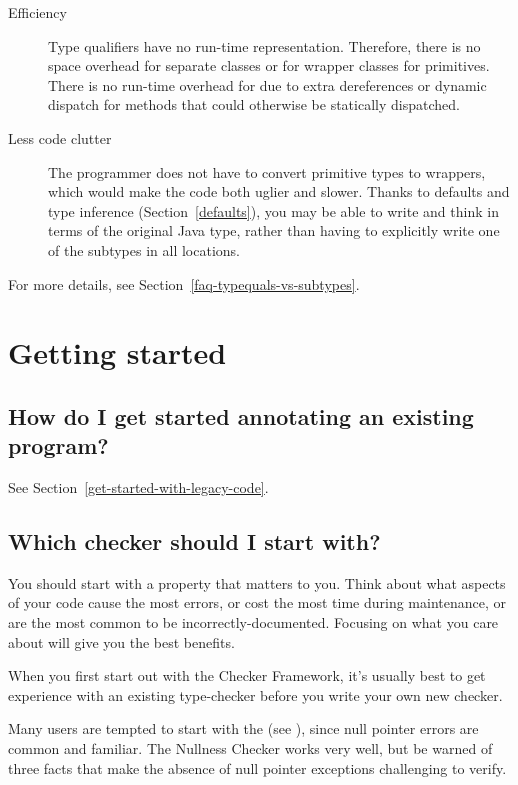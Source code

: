 \begin{description}
\item[Efficiency]
  Type qualifiers have no run-time representation.  Therefore, there is no
  space overhead for separate classes or for wrapper classes for
  primitives.  There is no run-time overhead for due to extra dereferences
  or dynamic dispatch for methods that could otherwise be statically
  dispatched.

\item[Less code clutter]
  The programmer does not have to convert primitive types to wrappers,
  which would make the code both uglier and slower.  Thanks to defaults and
  type inference (Section~\ref{defaults}),
  you may be able to write and think in terms of the
  original Java type, rather than having to explicitly write one of the
  subtypes in all locations.

\end{description}


For more details, see Section~\ref{faq-typequals-vs-subtypes}.



\section{Getting started\label{faq-getting-started-section}}

\subsection{How do I get started annotating an existing program?\label{faq-annotate-existing-program}}

See Section~\ref{get-started-with-legacy-code}.


\subsection{Which checker should I start with?\label{faq-first-checker}}

You should start with a property that matters to you.  Think about what
aspects of your code cause the most errors, or cost the most time during
maintenance, or are the most common to be incorrectly-documented.  Focusing
on what you care about will give you the best benefits.

When you first start out with the Checker Framework, it's usually best to
get experience with an existing type-checker before you write your own new
checker.

Many users are tempted to start with the
 (see
), since null pointer errors are common
and familiar.  The Nullness Checker works very well, but be warned of three
facts that make the absence of null pointer exceptions challenging to
verify.

